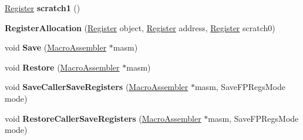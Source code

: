 \begin{DoxyCompactItemize}
\item 
\hyperlink{structv8_1_1internal_1_1_register}{Register} {\bfseries scratch1} ()\hypertarget{classv8_1_1internal_1_1_record_write_stub_1_1_register_allocation_a5834c8a35762e9a5346835d345b69bd2}{}\label{classv8_1_1internal_1_1_record_write_stub_1_1_register_allocation_a5834c8a35762e9a5346835d345b69bd2}

\item 
{\bfseries Register\+Allocation} (\hyperlink{structv8_1_1internal_1_1_register}{Register} object, \hyperlink{structv8_1_1internal_1_1_register}{Register} address, \hyperlink{structv8_1_1internal_1_1_register}{Register} scratch0)\hypertarget{classv8_1_1internal_1_1_record_write_stub_1_1_register_allocation_a9bd2c5bd869faf743a61ac1a0e89a8b3}{}\label{classv8_1_1internal_1_1_record_write_stub_1_1_register_allocation_a9bd2c5bd869faf743a61ac1a0e89a8b3}

\item 
void {\bfseries Save} (\hyperlink{classv8_1_1internal_1_1_macro_assembler}{Macro\+Assembler} $\ast$masm)\hypertarget{classv8_1_1internal_1_1_record_write_stub_1_1_register_allocation_a76f90ec53d09edfeb4a3de14141c921d}{}\label{classv8_1_1internal_1_1_record_write_stub_1_1_register_allocation_a76f90ec53d09edfeb4a3de14141c921d}

\item 
void {\bfseries Restore} (\hyperlink{classv8_1_1internal_1_1_macro_assembler}{Macro\+Assembler} $\ast$masm)\hypertarget{classv8_1_1internal_1_1_record_write_stub_1_1_register_allocation_a391db63ae1afc97c528cf3b5e92b9c2a}{}\label{classv8_1_1internal_1_1_record_write_stub_1_1_register_allocation_a391db63ae1afc97c528cf3b5e92b9c2a}

\item 
void {\bfseries Save\+Caller\+Save\+Registers} (\hyperlink{classv8_1_1internal_1_1_macro_assembler}{Macro\+Assembler} $\ast$masm, Save\+F\+P\+Regs\+Mode mode)\hypertarget{classv8_1_1internal_1_1_record_write_stub_1_1_register_allocation_a676d8a1bb19a5746cfc613e7374253e0}{}\label{classv8_1_1internal_1_1_record_write_stub_1_1_register_allocation_a676d8a1bb19a5746cfc613e7374253e0}

\item 
void {\bfseries Restore\+Caller\+Save\+Registers} (\hyperlink{classv8_1_1internal_1_1_macro_assembler}{Macro\+Assembler} $\ast$masm, Save\+F\+P\+Regs\+Mode mode)\hypertarget{classv8_1_1internal_1_1_record_write_stub_1_1_register_allocation_ab0958eb63ba22b285852dcc0cc87c285}{}\label{classv8_1_1internal_1_1_record_write_stub_1_1_register_allocation_ab0958eb63ba22b285852dcc0cc87c285}


\end{DoxyCompactItemize}
